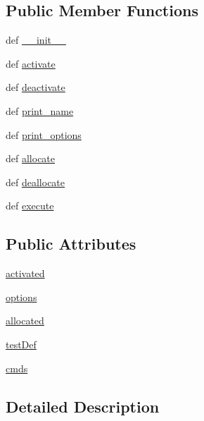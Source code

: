 \subsection*{Public Member Functions}
\begin{DoxyCompactItemize}
\item 
def \hyperlink{classShell_1_1Shell_a36cee8fc1bc0b3444cc672f5b66c0708}{\-\_\-\-\_\-init\-\_\-\-\_\-}
\item 
def \hyperlink{classShell_1_1Shell_a043911923f93dbf079dd559bb11843d0}{activate}
\item 
def \hyperlink{classShell_1_1Shell_af706278120f05ee7bdc82cc1a19becb2}{deactivate}
\item 
def \hyperlink{classShell_1_1Shell_a95d4da6fd233685f5ecbe7837dbc35ac}{print\-\_\-name}
\item 
def \hyperlink{classShell_1_1Shell_a7530d09d0ec49e48665d34c4dd5d7dfa}{print\-\_\-options}
\item 
def \hyperlink{classShell_1_1Shell_aaea88fad0ba8f7bf1da2fc113021add9}{allocate}
\item 
def \hyperlink{classShell_1_1Shell_ad0d25de668c93990107294a472b80737}{deallocate}
\item 
def \hyperlink{classShell_1_1Shell_a64c0f9c5cfbea625d0a3323a8b7c0f39}{execute}
\end{DoxyCompactItemize}
\subsection*{Public Attributes}
\begin{DoxyCompactItemize}
\item 
\hyperlink{classShell_1_1Shell_a5869d648354d59617e4a9836ef0c4ba3}{activated}
\item 
\hyperlink{classShell_1_1Shell_a3e2a9754ac3fa0e2a00c5f0861ef85f2}{options}
\item 
\hyperlink{classShell_1_1Shell_a7d3526fa682799bd7be51fa09c2c9017}{allocated}
\item 
\hyperlink{classShell_1_1Shell_ac2533422279cd3b3d3bc43e8b3de1301}{test\-Def}
\item 
\hyperlink{classShell_1_1Shell_abe2dca7284b995f29494ae5e2ea975a7}{cmds}
\end{DoxyCompactItemize}


\subsection{Detailed Description}


